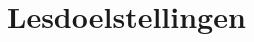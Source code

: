 \documentclass{vakfys}
\begin{document}
\maketitle
\toonidentificatie
\toonlesgegevens
\clearpage %
\toonbeginsituatie 

\toonwerkpunten
\toonlpdoelstellingen %
\toonvoorkennis

\section*{Lesdoelstellingen}
\tooncognitievedoelen
\clearpage
\toonaffectievedoelen
\toonvaardigheden
\toonbenodigdheden

\toonlesindeling
\clearpage
\toonvisualisering
\toonevaluatie
\end{document}
